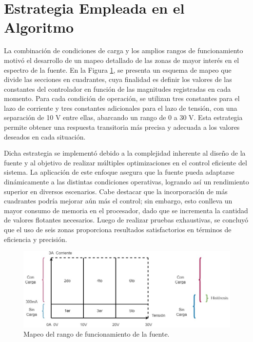 \section{Estrategia Empleada en el Algoritmo}
La combinación de condiciones de carga y los amplios rangos de funcionamiento motivó el desarrollo de un mapeo detallado de las zonas de mayor interés en el espectro de la fuente. En la Figura \ref{F:mapeo_cuadrantes}, se presenta un esquema de mapeo que divide las secciones en cuadrantes, cuya finalidad es definir los valores de las constantes del controlador en función de las magnitudes registradas en cada momento. Para cada condición de operación, se utilizan tres constantes para el lazo de corriente y tres constantes adicionales para el lazo de tensión, con una separación de 10 V entre ellas, abarcando un rango de 0 a 30 V. Esta estrategia permite obtener una respuesta transitoria más precisa y adecuada a los valores deseados en cada situación.\par
Dicha estrategia se implementó debido a la complejidad inherente al diseño de la fuente y al objetivo de realizar múltiples optimizaciones en el control eficiente del sistema. La aplicación de este enfoque asegura que la fuente pueda adaptarse dinámicamente a las distintas condiciones operativas, logrando así un rendimiento superior en diversos escenarios. Cabe destacar que la incorporación de más cuadrantes podría mejorar aún más el control; sin embargo, esto conlleva un mayor consumo de memoria en el procesador, dado que se incrementa la cantidad de valores flotantes necesarios. Luego de realizar pruebas exhaustivas, se concluyó que el uso de seis zonas proporciona resultados satisfactorios en términos de eficiencia y precisión.\par


\begin{figure}[H]
    \centering
    \includegraphics[scale=0.5]{./imagenes/matriz.jpg}
    \caption{Mapeo del rango de funcionamiento de la fuente.}
    \label{F:mapeo_cuadrantes}
\end{figure}\par


